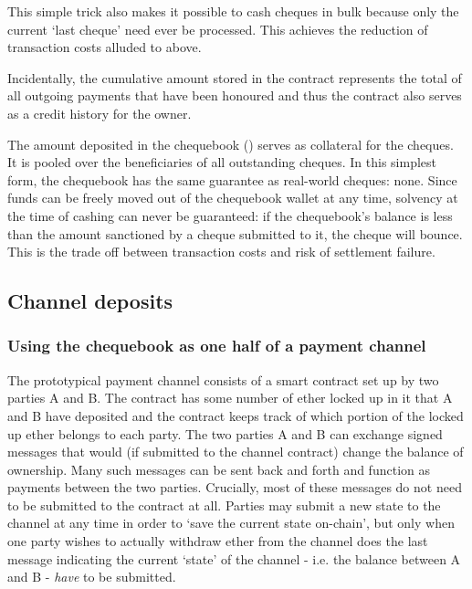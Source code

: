 This simple trick also makes it possible to cash cheques in bulk because only the current `last cheque' need ever be processed. This achieves the reduction of transaction costs alluded to above.

Incidentally, the cumulative amount stored in the contract represents the total of all outgoing payments that have been honoured and thus the contract also serves as a credit history for the owner.

The amount deposited in the chequebook () serves as collateral for the cheques. It is pooled over the beneficiaries of all outstanding cheques.
In this simplest form, the chequebook has the same guarantee as real-world cheques: none. Since funds can be freely moved out of the chequebook wallet at any time, solvency at the time of cashing can never be guaranteed: if the chequebook's balance is less than the amount sanctioned by a cheque submitted to it, the cheque will bounce. This is the trade off between transaction costs and risk of settlement failure.





\subsection{Channel deposits}

\subsubsection{Using the chequebook as one half of a payment channel}
The prototypical payment channel consists of a smart contract set up by two parties A and B. The contract has some number of ether locked up in it that A and B have deposited and the contract keeps track of which portion of the locked up ether belongs to each party. The two parties A and B can exchange signed messages that would (if submitted to the channel contract) change the balance of ownership. Many such messages can be sent back and forth and function as payments between the two parties. Crucially, most of these messages do not need to be submitted to the contract at all. Parties may submit a new state to the channel at any time in order to `save the current state on-chain', but only when one party wishes to actually withdraw ether from the channel does the last message indicating the current `state' of the channel - i.e. the balance between A and B - \emph{have} to be submitted.

